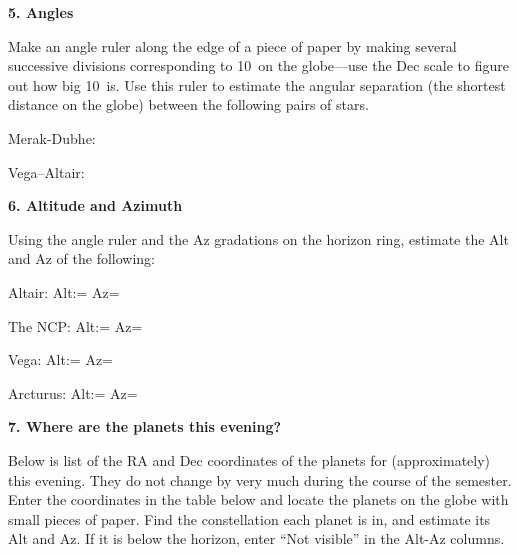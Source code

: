 \bigskip\noindent
{\bf 5. Angles}

\bigskip\noindent
Make an angle ruler along the edge of a piece of paper by making
several successive divisions corresponding to 10\deg\ on the
globe---use the Dec scale to figure out how big 10\deg\ is.  Use this
ruler to estimate the angular separation (the shortest distance on the
globe) between the following pairs of stars.

\bigskip
Merak-Dubhe: \makebox[4cm]{\hrulefill}

Vega--Altair: \makebox[4cm]{\hrulefill}
  
\bigskip
\noindent
{\bf 6. Altitude and Azimuth}

\bigskip
\noindent
Using the angle ruler and the Az gradations on the horizon ring, 
estimate the Alt and Az of the following:

\medskip   
Altair: Alt:= \makebox[4cm]{\hrulefill} Az= \makebox[4cm]{\hrulefill}

The NCP:  Alt:= \makebox[4cm]{\hrulefill} Az= \makebox[4cm]{\hrulefill}

Vega: Alt:= \makebox[4cm]{\hrulefill} Az= \makebox[4cm]{\hrulefill}

Arcturus: Alt:= \makebox[4cm]{\hrulefill} Az= \makebox[4cm]{\hrulefill}

\bigskip

\clearpage 
\noindent
{\bf 7. Where are the planets this evening?}

\bigskip
\noindent
Below is list of the RA and Dec coordinates of the planets for
(approximately) this evening. They do not change by very much during
the course of the semester. Enter the coordinates in the table below
and locate the planets on the globe with small pieces of paper. Find
the constellation each planet is in, and estimate its Alt and Az. If
it is below the horizon, enter ``Not visible'' in the Alt-Az columns.

